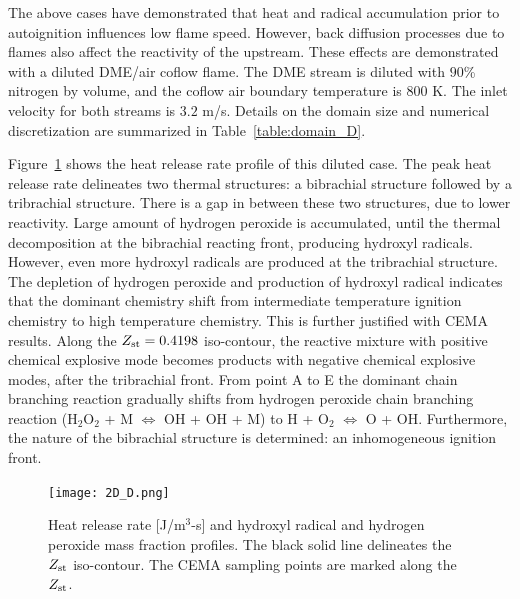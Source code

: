 \documentclass[review,3p,times]{elsarticle}
\begin{document}
\textcolor{dl}{The above cases have demonstrated that heat and radical accumulation prior to autoignition influences low flame speed.  However, back diffusion processes due to flames also affect the reactivity of the upstream.  These effects are demonstrated with a diluted DME/air coflow flame.  The DME stream is diluted with $90$\% nitrogen by volume, and the coflow air boundary temperature is $800$ K.  The inlet velocity for both streams is $3.2$ m/s.  Details on the domain size and numerical discretization are summarized in Table~\ref{table:domain_D}.} 

\begin{table}
  \caption{Computational domain and number of grid points for the diluted case.}
  \label{table:domain_D}
  \centering
  \normalsize
\end{table}

\textcolor{dl}{Figure~\ref{fig:2D_D} shows the heat release rate profile of this diluted case.  The peak heat release rate delineates two thermal structures: a bibrachial structure followed by a tribrachial structure.  There is a gap in between these two structures, due to lower reactivity.  Large amount of hydrogen peroxide is accumulated, until the thermal decomposition at the bibrachial reacting front, producing hydroxyl radicals.  However, even more hydroxyl radicals are produced at the tribrachial structure.  The depletion of hydrogen peroxide and production of hydroxyl radical indicates that the dominant chemistry shift from intermediate temperature ignition chemistry to high temperature chemistry.  This is further justified with CEMA results.  Along the $Z_{\rm st} = 0.4198$ iso-contour, the reactive mixture with positive chemical explosive mode becomes products with negative chemical explosive modes, after the tribrachial front.  From point A to E the dominant chain branching reaction gradually shifts from hydrogen peroxide chain branching reaction (H$_2$O$_2$ + M $\Longleftrightarrow$ OH + OH + M) to H + O$_2$ $\Longleftrightarrow$ O + OH.  Furthermore, the nature of the bibrachial structure is determined: an inhomogeneous ignition front.}

\begin{figure}
  \centering
  \scriptsize
  \vspace{-0.1in}
  \texttt{[image: 2D\_D.png]}
  \normalsize
  \vspace{-0.4in}
  \caption{Heat release rate [J/m$^3$-s] and hydroxyl radical and hydrogen peroxide mass fraction profiles.  The black solid line delineates the $Z_{\rm st}$ iso-contour.  The CEMA sampling points are marked along the $Z_{\rm st}$.}
  \label{fig:2D_D}
\end{figure}
\end{document}
